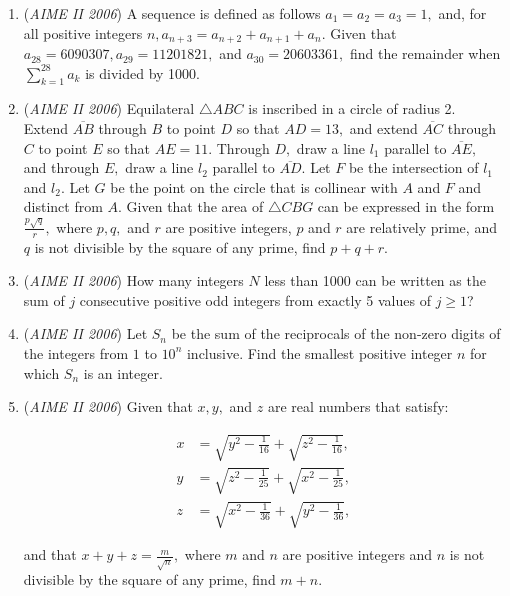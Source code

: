 \begin{enumerate}
	\item (\textit{AIME II 2006}) A sequence is defined as follows $a_1=a_2=a_3=1,$ and, for all positive integers $n, a_{n+3}=a_{n+2}+a_{n+1}+a_n.$ Given that $a_{28}=6090307, a_{29}=11201821,$ and $a_{30}=20603361,$ find the remainder when $\sum^{28}_{k=1} a_k$ is divided by 1000.


 

	\item (\textit{AIME II 2006}) Equilateral $\triangle ABC$ is inscribed in a circle of radius 2. Extend $\overline{AB}$ through $B$ to point $D$ so that $AD=13,$ and extend $\overline{AC}$ through $C$ to point $E$ so that $AE = 11.$ Through $D,$ draw a line $l_1$ parallel to $\overline{AE},$ and through $E,$ draw a line $l_2$ parallel to $\overline{AD}.$ Let $F$ be the intersection of $l_1$ and $l_2.$ Let $G$ be the point on the circle that is collinear with $A$ and $F$ and distinct from $A.$ Given that the area of $\triangle CBG$ can be expressed in the form $\frac{p\sqrt{q}}{r},$  where $p, q,$ and $r$ are positive integers, $p$ and $r$  are relatively prime, and $q$ is not divisible by the square of any prime, find $p+q+r.$


	\item (\textit{AIME II 2006}) How many integers $N$ less than 1000 can be written as the sum of $j$ consecutive positive odd integers from exactly 5 values of $j\ge 1$?


 

	\item (\textit{AIME II 2006}) Let $S_n$ be the sum of the reciprocals of the non-zero digits of the integers from $1$ to $10^n$ inclusive. Find the smallest positive integer $n$ for which $S_n$ is an integer.


 

	\item (\textit{AIME II 2006}) Given that $x, y,$ and $z$ are real numbers that satisfy:

 \begin{align*} x &= \sqrt{y^2-\frac{1}{16}}+\sqrt{z^2-\frac{1}{16}}, \\ y &= \sqrt{z^2-\frac{1}{25}}+\sqrt{x^2-\frac{1}{25}}, \\ z &= \sqrt{x^2 - \frac 1{36}}+\sqrt{y^2-\frac 1{36}}, \end{align*}

and that $x+y+z = \frac{m}{\sqrt{n}},$ where $m$ and $n$ are positive integers and $n$ is not divisible by the square of any prime, find $m+n.$


\end{enumerate}